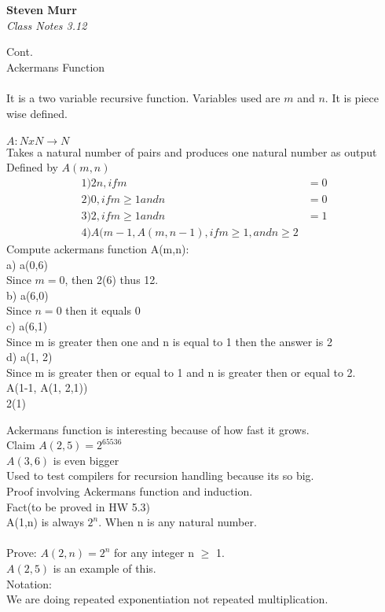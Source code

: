 \documentclass{article}
\begin{document}
\setcounter{totalnumber}{5}
   \begin{flushright}
      \Large\textbf{Steven Murr}\\
      \large\textit{Class Notes 3.12}
   \end{flushright}
\begin{flushleft}
\makeatletter%
\setlength{\@fptop}{5pt}
 Cont. \\
Ackermans Function \\
~\\
It is a two variable recursive function.  Variables used are $m $ and $n$.  It is piece wise defined.\\
~\\
$A: N x N \rightarrow N$ \\
Takes a natural number of pairs and produces one natural number as output \\ 
Defined by $A(m,n)$ \\
\begin{align*}
1) 2n, if m &= 0 \\
2) 0, if m \geq 1 and n &= 0 \\
3) 2, if m\geq 1 and n &= 1 \\
4) A(m-1,A(m, n-1), if m \geq 1, and n \geq 2
\end{align*}
Compute ackermans function A(m,n): \\
a) a(0,6) \\
Since $m = 0$, then 2(6) thus 12.\\
b) a(6,0) \\
Since $n = 0$ then it equals 0 \\
c) a(6,1) \\
Since m is greater then one and n is equal to 1 then the answer is 2 \\
d) a(1, 2) \\
Since m is greater then or equal to 1 and n is greater then or equal to 2. \\
A(1-1, A(1, 2,1)) \\
2(1)

Ackermans function is interesting because of how fast it grows.  \\
Claim $A(2,5) = 2^65536$ \\
$A(3,6)$ is even bigger \\
Used to test compilers for recursion handling because its so big. \\

Proof involving Ackermans function and induction. \\
Fact(to be proved in HW 5.3) \\
A(1,n) is always $2^n$.  When n is any natural number. \\
~\\
Prove: $A(2, n) = 2^n$ for any integer n $\geq $ 1.\\
$A(2,5)$ is an example of this. \\
Notation: \\

We are doing repeated exponentiation not repeated multiplication. \\

\begin{align*}

\end{align*}

\end{flushleft}
\end{document}
